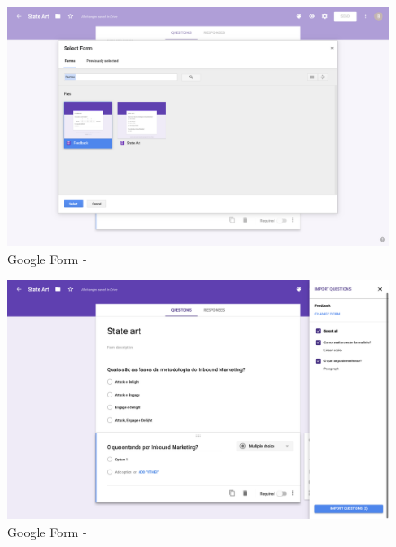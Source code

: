 \begin{figure}[h!]
	\begin{center}
		\includegraphics[width=1\textwidth]{img/gf/gf-form-import}
		\caption{Google Form - }
		\label{fig:gf-form-import}
	\end{center}
\end{figure}

\begin{figure}[h!]
	\begin{center}
		\includegraphics[width=1\textwidth]{img/gf/gf-form-import-select}
		\caption{Google Form - }
		\label{fig:gf-form-import-select}
	\end{center}
\end{figure}

